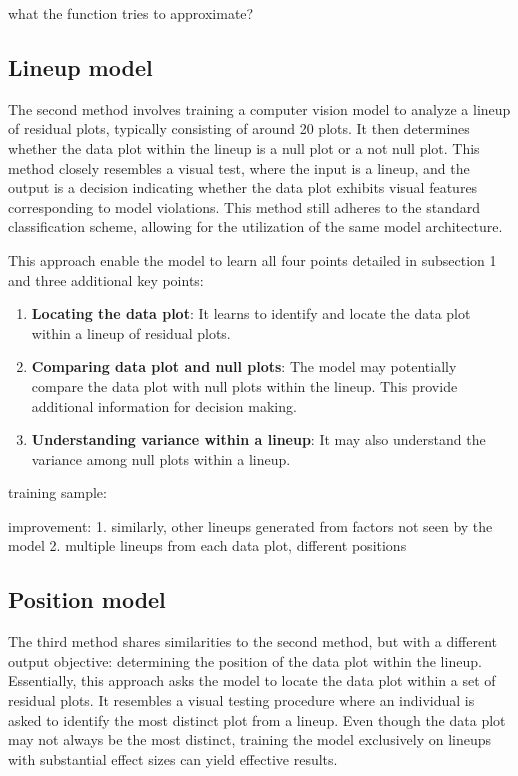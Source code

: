 \documentclass[]{interact}
\theoremstyle{plain}%
\theoremstyle{definition}
\theoremstyle{remark}
\begin{document}
what the function tries to approximate?

\hypertarget{lineup-model}{%
\subsection{Lineup model}\label{lineup-model}}

The second method involves training a computer vision model to analyze a
lineup of residual plots, typically consisting of around 20 plots. It
then determines whether the data plot within the lineup is a null plot
or a not null plot. This method closely resembles a visual test, where
the input is a lineup, and the output is a decision indicating whether
the data plot exhibits visual features corresponding to model
violations. This method still adheres to the standard classification
scheme, allowing for the utilization of the same model architecture.

This approach enable the model to learn all four points detailed in
subsection 1 and three additional key points:

\begin{enumerate}
\def\labelenumi{\arabic{enumi}.}
\item
  \textbf{Locating the data plot}: It learns to identify and locate the
  data plot within a lineup of residual plots.
\item
  \textbf{Comparing data plot and null plots}: The model may potentially
  compare the data plot with null plots within the lineup. This provide
  additional information for decision making.
\item
  \textbf{Understanding variance within a lineup}: It may also
  understand the variance among null plots within a lineup.
\end{enumerate}

training sample:

improvement: 1. similarly, other lineups generated from factors not seen
by the model 2. multiple lineups from each data plot, different
positions

\hypertarget{position-model}{%
\subsection{Position model}\label{position-model}}

The third method shares similarities to the second method, but with a
different output objective: determining the position of the data plot
within the lineup. Essentially, this approach asks the model to locate
the data plot within a set of residual plots. It resembles a visual
testing procedure where an individual is asked to identify the most
distinct plot from a lineup. Even though the data plot may not always be
the most distinct, training the model exclusively on lineups with
substantial effect sizes can yield effective results.
\end{document}
